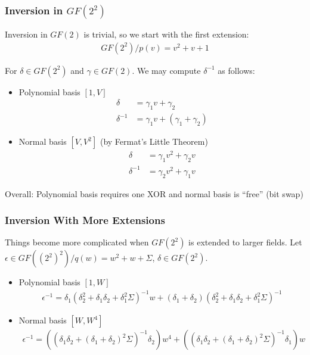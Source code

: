 \documentclass[handout,10pt]{beamer}
\begin{document}
\begin{frame}
	\frametitle{Inversion in $GF(2^2)$}
	Inversion in $GF(2)$ is trivial, so we start with the first extension:
	\begin{align*}
		GF(2^2) / p(v) = v^2 + v + 1
	\end{align*}

	\medskip
	For $\delta \in GF(2^2)$ and $\gamma \in GF(2)$. We may compute $\delta^{-1}$ as follows:
	\pause
	\begin{itemize}
		\item Polynomial basis $[1, V]$
		\begin{align*}
			\delta & = \gamma_1 v + \gamma_2 \\
			\delta^{-1} & = \gamma_1 v + (\gamma_1 + \gamma_2)
		\end{align*}
		\pause
		\item Normal basis $[V, V^2]$ (by Fermat's Little Theorem)
		\begin{align*}
			\delta & = \gamma_1 v^2 + \gamma_2 v \\
			\delta^{-1} & = \gamma_2 v^2 + \gamma_1 v
		\end{align*}
	\end{itemize}

	\pause
	Overall: Polynomial basis requires one XOR and normal basis is ``free'' (bit swap)

\end{frame}

\begin{frame}
	\frametitle{Inversion With More Extensions}
	Things become more complicated when $GF(2^2)$ is extended to larger fields. Let $\epsilon \in GF((2^2)^2)/q(w) = w^2 + w + \Sigma$, $\delta \in GF(2^2)$.
	\pause
	\medskip
	\begin{itemize}
		\item Polynomial basis $[1, W]$
		\begin{align*}
			\epsilon^{-1} = \delta_1(\delta_2^2 + \delta_1\delta_2 + \delta_1^2\Sigma)^{-1}w + (\delta_1 + \delta_2)(\delta_2^2 + \delta_1\delta_2 + \delta_1^2\Sigma)^{-1}
		\end{align*}
		\pause
		\item Normal basis $[W, W^4]$
		\begin{align*}
			\epsilon^{-1} = ((\delta_1\delta_2 + (\delta_1 + \delta_2)^2\Sigma)^{-1}\delta_2) w^4 + ((\delta_1\delta_2 + (\delta_1 + \delta_2)^2\Sigma)^{-1}\delta_1) w
		\end{align*}
	\end{itemize}

\end{frame}
\end{document}
